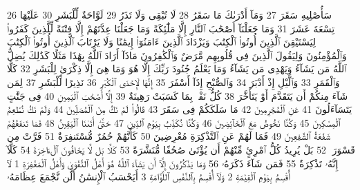 {\tiny\colorbox{cl_aya}{26}} سَأُصْلِيهِ سَقَرَ
{\tiny\colorbox{cl_aya}{27}} وَمَآ أَدْرَىٰكَ مَا سَقَرُ
{\tiny\colorbox{cl_aya}{28}} لَا تُبْقِى وَلَا تَذَرُ
{\tiny\colorbox{cl_aya}{29}} لَوَّاحَةٌ لِّلْبَشَرِ
{\tiny\colorbox{cl_aya}{30}} عَلَيْهَا تِسْعَةَ عَشَرَ
{\tiny\colorbox{cl_aya}{31}} وَمَا جَعَلْنَآ أَصْحَٰبَ ٱلنَّارِ إِلَّا مَلَٰٓئِكَةً وَمَا جَعَلْنَا عِدَّتَهُمْ إِلَّا فِتْنَةً لِّلَّذِينَ كَفَرُوا۟ لِيَسْتَيْقِنَ ٱلَّذِينَ أُوتُوا۟ ٱلْكِتَٰبَ وَيَزْدَادَ ٱلَّذِينَ ءَامَنُوٓا۟ إِيمَٰنًا وَلَا يَرْتَابَ ٱلَّذِينَ أُوتُوا۟ ٱلْكِتَٰبَ وَٱلْمُؤْمِنُونَ وَلِيَقُولَ ٱلَّذِينَ فِى قُلُوبِهِم مَّرَضٌ وَٱلْكَٰفِرُونَ مَاذَآ أَرَادَ ٱللَّهُ بِهَٰذَا مَثَلًا كَذَٰلِكَ يُضِلُّ ٱللَّهُ مَن يَشَآءُ وَيَهْدِى مَن يَشَآءُ وَمَا يَعْلَمُ جُنُودَ رَبِّكَ إِلَّا هُوَ وَمَا هِىَ إِلَّا ذِكْرَىٰ لِلْبَشَرِ
{\tiny\colorbox{cl_aya}{32}} كَلَّا وَٱلْقَمَرِ
{\tiny\colorbox{cl_aya}{33}} وَٱلَّيْلِ إِذْ أَدْبَرَ
{\tiny\colorbox{cl_aya}{34}} وَٱلصُّبْحِ إِذَآ أَسْفَرَ
{\tiny\colorbox{cl_aya}{35}} إِنَّهَا لَإِحْدَى ٱلْكُبَرِ
{\tiny\colorbox{cl_aya}{36}} نَذِيرًا لِّلْبَشَرِ
{\tiny\colorbox{cl_aya}{37}} لِمَن شَآءَ مِنكُمْ أَن يَتَقَدَّمَ أَوْ يَتَأَخَّرَ
{\tiny\colorbox{cl_aya}{38}} كُلُّ نَفْسٍۭ بِمَا كَسَبَتْ رَهِينَةٌ
{\tiny\colorbox{cl_aya}{39}} إِلَّآ أَصْحَٰبَ ٱلْيَمِينِ
{\tiny\colorbox{cl_aya}{40}} فِى جَنَّٰتٍ يَتَسَآءَلُونَ
{\tiny\colorbox{cl_aya}{41}} عَنِ ٱلْمُجْرِمِينَ
{\tiny\colorbox{cl_aya}{42}} مَا سَلَكَكُمْ فِى سَقَرَ
{\tiny\colorbox{cl_aya}{43}} قَالُوا۟ لَمْ نَكُ مِنَ ٱلْمُصَلِّينَ
{\tiny\colorbox{cl_aya}{44}} وَلَمْ نَكُ نُطْعِمُ ٱلْمِسْكِينَ
{\tiny\colorbox{cl_aya}{45}} وَكُنَّا نَخُوضُ مَعَ ٱلْخَآئِضِينَ
{\tiny\colorbox{cl_aya}{46}} وَكُنَّا نُكَذِّبُ بِيَوْمِ ٱلدِّينِ
{\tiny\colorbox{cl_aya}{47}} حَتَّىٰٓ أَتَىٰنَا ٱلْيَقِينُ
{\tiny\colorbox{cl_aya}{48}} فَمَا تَنفَعُهُمْ شَفَٰعَةُ ٱلشَّٰفِعِينَ
{\tiny\colorbox{cl_aya}{49}} فَمَا لَهُمْ عَنِ ٱلتَّذْكِرَةِ مُعْرِضِينَ
{\tiny\colorbox{cl_aya}{50}} كَأَنَّهُمْ حُمُرٌ مُّسْتَنفِرَةٌ
{\tiny\colorbox{cl_aya}{51}} فَرَّتْ مِن قَسْوَرَةٍۭ
{\tiny\colorbox{cl_aya}{52}} بَلْ يُرِيدُ كُلُّ ٱمْرِئٍ مِّنْهُمْ أَن يُؤْتَىٰ صُحُفًا مُّنَشَّرَةً
{\tiny\colorbox{cl_aya}{53}} كَلَّا بَل لَّا يَخَافُونَ ٱلْءَاخِرَةَ
{\tiny\colorbox{cl_aya}{54}} كَلَّآ إِنَّهُۥ تَذْكِرَةٌ
{\tiny\colorbox{cl_aya}{55}} فَمَن شَآءَ ذَكَرَهُۥ
{\tiny\colorbox{cl_aya}{56}} وَمَا يَذْكُرُونَ إِلَّآ أَن يَشَآءَ ٱللَّهُ هُوَ أَهْلُ ٱلتَّقْوَىٰ وَأَهْلُ ٱلْمَغْفِرَةِ
{\tiny\colorbox{cl_aya}{1}} لَآ أُقْسِمُ بِيَوْمِ ٱلْقِيَٰمَةِ
{\tiny\colorbox{cl_aya}{2}} وَلَآ أُقْسِمُ بِٱلنَّفْسِ ٱللَّوَّامَةِ
{\tiny\colorbox{cl_aya}{3}} أَيَحْسَبُ ٱلْإِنسَٰنُ أَلَّن نَّجْمَعَ عِظَامَهُۥ
